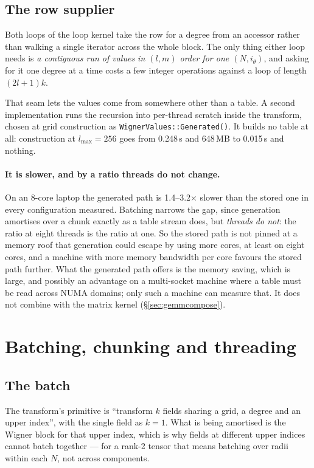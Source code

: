 \documentclass[11pt,a4paper]{article}
\newcommand{\code}[1]{\texttt{#1}}
\begin{document}
\subsection{The row supplier}

Both loops of the loop kernel take the row for a degree from an accessor
rather than walking a single iterator across the whole block.  The only
thing either loop needs is \emph{a contiguous run of values in $(l,m)$
order for one $(N,i_\theta)$}, and asking for it one degree at a time costs
a few integer operations against a loop of length $(2l+1)k$.

That seam lets the values come from somewhere other than a table.  A
second implementation runs the recursion into per-thread scratch inside
the transform, chosen at grid construction as
\code{WignerValues::Generated()}.  It builds no table at all: construction at $l_{\max}=256$
goes from 0.248\,s and 648\,MB to 0.015\,s and nothing.

\paragraph{It is slower, and by a ratio threads do not change.}  On an
8-core laptop the generated path is 1.4--3.2$\times$ slower than the
stored one in every configuration measured.  Batching narrows the gap,
since generation amortises over a chunk exactly as a table stream does,
but \emph{threads do not}: the ratio at eight threads is the ratio at one.
So the stored path is not pinned at a memory roof that generation could
escape by using more cores, at least on eight cores, and a machine with
more memory bandwidth per core favours the stored path further.  What the
generated path offers is the memory saving, which is large, and possibly
an advantage on a multi-socket machine where a table must be read across
NUMA domains; only such a machine can measure that.  It does not combine
with the matrix kernel (\S\ref{sec:gemmcompose}).

\section{Batching, chunking and threading}
\label{sec:batching}

\subsection{The batch}

The transform's primitive is ``transform $k$ fields sharing a grid, a
degree and an upper index'', with the single field as $k=1$.  What is
being amortised is the Wigner block for that upper index, which is why
fields at different upper indices cannot batch together --- for a rank-2
tensor that means batching over radii within each $N$, not across
components.
\end{document}
